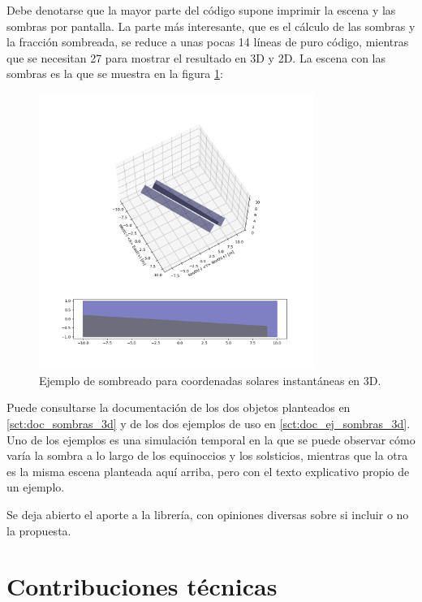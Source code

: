 Debe denotarse que la mayor parte del código supone imprimir la escena y las sombras por pantalla. La parte más interesante, que es el cálculo de las sombras y la fracción sombreada, se reduce a unas pocas 14 líneas de puro código, mientras que se necesitan 27 para mostrar el resultado en 3D y 2D. La escena con las sombras es la que se muestra en la figura \ref{fig:sombreado_3d}:

\begin{figure}[H]
    \centering
    \includegraphics[width=0.8\textwidth]{./images/shading_3d/sphx_glr_plot_spatial_row_to_row_shading_001.png}
    \caption{Ejemplo de sombreado para coordenadas solares instantáneas en 3D.}
    \label{fig:sombreado_3d}
\end{figure}

Puede consultarse la documentación de los dos objetos planteados en \ref{sct:doc_sombras_3d} y de los dos ejemplos de uso en \ref{sct:doc_ej_sombras_3d}. Uno de los ejemplos es una simulación temporal en la que se puede observar cómo varía la sombra a lo largo de los equinoccios y los solsticios, mientras que la otra es la misma escena planteada aquí arriba, pero con el texto explicativo propio de un ejemplo.

Se deja abierto el aporte a la librería, con opiniones diversas sobre si incluir o no la propuesta.

\section{Contribuciones técnicas} \label{sct:desarrollo:contribuciones_tecnicas}

